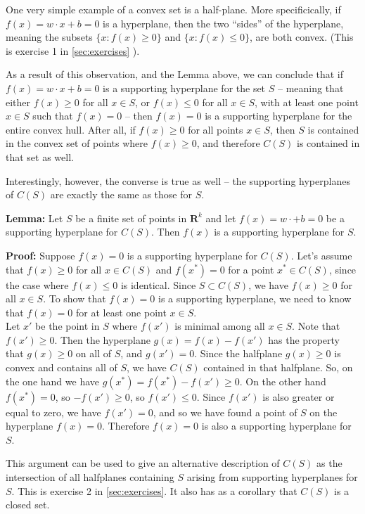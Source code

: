 \documentclass[
]{article}
\begin{document}
One very simple example of a convex set is a half-plane. More
specificically, if \(f(x)=w\cdot x+b=0\) is a hyperplane, then the two
``sides'' of the hyperplane, meaning the subsets \(\{x: f(x)\ge 0\}\)
and \(\{x: f(x)\le 0\}\), are both convex. (This is exercise 1 in
\cref{sec:exercises} ).

As a result of this observation, and the Lemma above, we can conclude
that if \(f(x)=w\cdot x+b=0\) is a supporting hyperplane for the set
\(S\) -- meaning that either \(f(x)\ge 0\) for all \(x\in S\), or
\(f(x)\le 0\) for all \(x\in S\), with at least one point \(x\in S\)
such that \(f(x)=0\) -- then \(f(x)=0\) is a supporting hyperplane for
the entire convex hull. After all, if \(f(x)\ge 0\) for all points
\(x\in S\), then \(S\) is contained in the convex set of points where
\(f(x)\ge 0\), and therefore \(C(S)\) is contained in that set as well.

Interestingly, however, the converse is true as well -- the supporting
hyperplanes of \(C(S)\) are exactly the same as those for \(S\).

\textbf{Lemma:} Let \(S\) be a finite set of points in
\(\mathbf{R}^{k}\) and let \(f(x)=w\cdot +b=0\) be a supporting
hyperplane for \(C(S)\). Then \(f(x)\) is a supporting hyperplane for
\(S\).

\textbf{Proof:} Suppose \(f(x)=0\) is a supporting hyperplane for
\(C(S)\). Let's assume that \(f(x)\ge 0\) for all \(x\in C(S)\) and
\(f(x^{*})=0\) for a point \(x^{*}\in C(S)\), since the case where
\(f(x)\le 0\) is identical. Since \(S\subset C(S)\), we have
\(f(x)\ge 0\) for all \(x\in S\). To show that \(f(x)=0\) is a
supporting hyperplane, we need to know that \(f(x)=0\) for at least one
point \(x\in S\).\\
Let \(x'\) be the point in \(S\) where \(f(x')\) is minimal among all
\(x\in S\). Note that \(f(x')\ge 0\). Then the hyperplane
\(g(x) = f(x)-f(x')\) has the property that \(g(x)\ge 0\) on all of
\(S\), and \(g(x')=0\). Since the halfplane \(g(x)\ge 0\) is convex and
contains all of \(S\), we have \(C(S)\) contained in that halfplane. So,
on the one hand we have \(g(x^{*})=f(x^{*})-f(x')\ge 0\). On the other
hand \(f(x^{*})=0\), so \(-f(x')\ge 0\), so \(f(x')\le 0\). Since
\(f(x')\) is also greater or equal to zero, we have \(f(x')=0\), and so
we have found a point of \(S\) on the hyperplane \(f(x)=0\). Therefore
\(f(x)=0\) is also a supporting hyperplane for \(S\).

This argument can be used to give an alternative description of \(C(S)\)
as the intersection of all halfplanes containing \(S\) arising from
supporting hyperplanes for \(S\). This is exercise 2 in
\cref{sec:exercises}. It also has as a corollary that \(C(S)\) is a
closed set.
\end{document}
